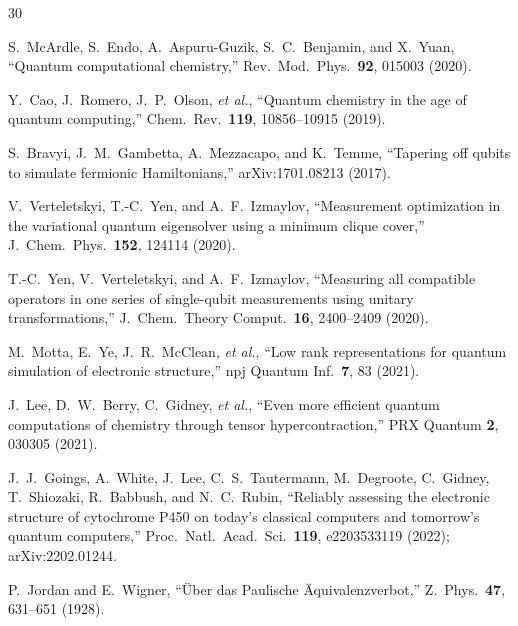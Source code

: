 \documentclass[aps,pra,twocolumn,superscriptaddress,longbibliography]{revtex4-2}
\begin{document}
\begin{thebibliography}{30}


S.~McArdle, S.~Endo, A.~Aspuru-Guzik, S.~C.~Benjamin, and X.~Yuan,
``Quantum computational chemistry,''
Rev.\ Mod.\ Phys.\ \textbf{92}, 015003 (2020).

Y.~Cao, J.~Romero, J.~P.~Olson, \textit{et al.},
``Quantum chemistry in the age of quantum computing,''
Chem.\ Rev.\ \textbf{119}, 10856--10915 (2019).


S.~Bravyi, J.~M.~Gambetta, A.~Mezzacapo, and K.~Temme,
``Tapering off qubits to simulate fermionic Hamiltonians,''
arXiv:1701.08213 (2017).

V.~Verteletskyi, T.-C.~Yen, and A.~F.~Izmaylov,
``Measurement optimization in the variational quantum eigensolver using a
minimum clique cover,''
J.\ Chem.\ Phys.\ \textbf{152}, 124114 (2020).

T.-C.~Yen, V.~Verteletskyi, and A.~F.~Izmaylov,
``Measuring all compatible operators in one series of single-qubit
measurements using unitary transformations,''
J.\ Chem.\ Theory Comput.\ \textbf{16}, 2400--2409 (2020).


M.~Motta, E.~Ye, J.~R.~McClean, \textit{et al.},
``Low rank representations for quantum simulation of electronic structure,''
npj Quantum Inf.\ \textbf{7}, 83 (2021).

J.~Lee, D.~W.~Berry, C.~Gidney, \textit{et al.},
``Even more efficient quantum computations of chemistry through tensor
hypercontraction,''
PRX Quantum \textbf{2}, 030305 (2021).

J.~J.~Goings, A.~White, J.~Lee, C.~S.~Tautermann, M.~Degroote,
C.~Gidney, T.~Shiozaki, R.~Babbush, and N.~C.~Rubin,
``Reliably assessing the electronic structure of cytochrome P450 on
today's classical computers and tomorrow's quantum computers,''
Proc.\ Natl.\ Acad.\ Sci.\ \textbf{119}, e2203533119 (2022);
arXiv:2202.01244.


P.~Jordan and E.~Wigner,
``\"Uber das Paulische \"Aquivalenzverbot,''
Z.\ Phys.\ \textbf{47}, 631--651 (1928).


\end{thebibliography}
\end{document}
